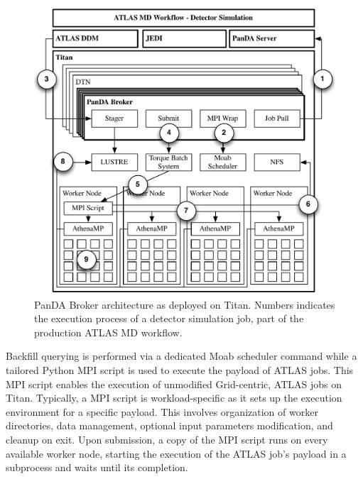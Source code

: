 \begin{figure}
  \begin{center}
    \includegraphics[width=\columnwidth]{figures/panda_broker_architecture.pdf}
    \caption{PanDA Broker architecture as deployed on Titan. Numbers indicates
    the execution process of a detector simulation job, part of the production
    ATLAS MD workflow.}
  \end{center}
\label{fig:panda_broker}
\end{figure}

Backfill querying is performed via a dedicated Moab scheduler command while a
tailored Python MPI script is used to execute the payload of ATLAS jobs. This
MPI script enables the execution of unmodified Grid-centric, ATLAS jobs on
Titan. Typically, a MPI script is workload-specific as it sets up the execution
environment for a specific payload. This involves organization of worker
directories, data management, optional input parameters modification, and
cleanup on exit. Upon submission, a copy of the MPI script runs on every
available worker node,
starting the execution of the ATLAS job's payload in a subprocess and waits
until its completion.

